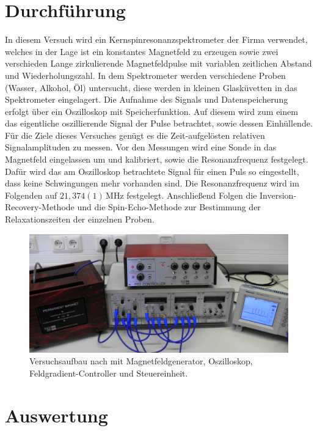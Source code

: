 \documentclass[numbers=noenddot,a4paper,notitlepage,twoside,BCOR15mm]{scrartcl}
\begin{document}
	\section{Durchführung}
	In diesem Versuch wird ein Kernspinresonanzspektrometer der Firma verwendet, welches in der Lage ist ein konstantes Magnetfeld zu erzeugen sowie zwei verschieden Lange zirkulierende Magnetfeldpulse mit variablen zeitlichen Abstand und Wiederholungszahl. In dem Spektrometer werden verschiedene Proben (Wasser, Alkohol, Öl) untersucht, diese werden in kleinen Glasküvetten in das Spektrometer eingelagert. Die Aufnahme des Signals und Datenspeicherung erfolgt über ein Oszilloskop mit Speicherfunktion. Auf diesem wird zum einem das eigentliche oszillierende Signal der Pulse betrachtet, sowie dessen Einhüllende. Für die Ziele dieses Versuches genügt es die Zeit-aufgelösten relativen Signalamplituden zu messen. Vor den Messungen wird eine Sonde in das Magnetfeld eingelassen um und kalibriert, sowie die Resonanzfrequenz festgelegt. Dafür wird das am Oszilloskop betrachtete Signal für einen Puls so eingestellt, dass keine Schwingungen mehr vorhanden sind. Die Resonanzfrequenz wird im Folgenden auf $21,374(1)\,\mathrm{MHz}$ festgelegt. Anschließend Folgen die Inversion-Recovery-Methode und die Spin-Echo-Methode zur Bestimmung der Relaxationszeiten der einzelnen Proben.
				\begin{figure}[h]
					\centering
					\includegraphics[width=\textwidth]{pics/aufbau.png}
					\caption{Versuchsaufbau nach \cite{EMAUGreifswaldNMR} mit Magnetfeldgenerator, Oszilloskop, Feldgradient-Controller und Steuereinheit.}
				\end{figure}
	\newpage
	\section{Auswertung}
	
\end{document}
